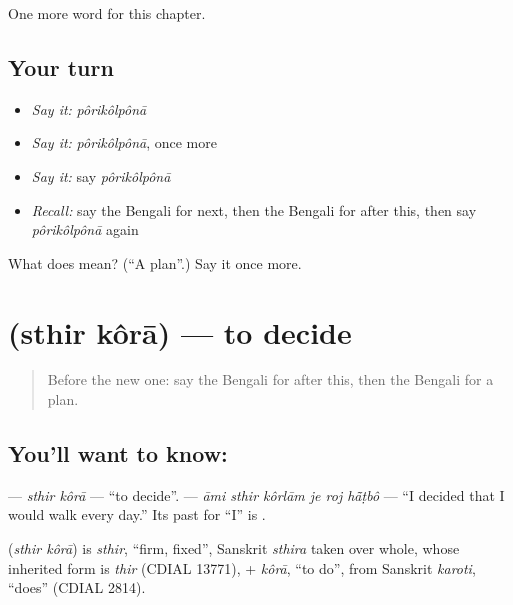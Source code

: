\begin{grammarlens}[title={What you've built}]
One more word for this chapter.
\end{grammarlens}

\subsection*{Your turn}
\begin{itemize}
\raggedright
  \item \emph{Say it:} \emph{pôrikôlpônā}
  \item \emph{Say it:} \emph{pôrikôlpônā}, once more
  \item \emph{Say it:} say \emph{pôrikôlpônā}
  \item \emph{Recall:} say the Bengali for next, then the Bengali for after this, then say \emph{pôrikôlpônā} again
\end{itemize}

\begin{tcolorbox}[breakable,colback=teal!4,colframe=teal!35!black,title={Before you move on}]
What does  mean? (\textquotedblleft{}A plan\textquotedblright{}.) Say it once more.
\end{tcolorbox}
\section[\texorpdfstring{\bn{স্থির} \bn{করা} (sthir kôrā)}{স্থির করা (sthir kôrā)}]{  (sthir kôrā) — to decide}

\label{lesson:BN-C146-sthir-kora}



\begin{quote}
Before the new one: say the Bengali for after this, then the Bengali for a plan.
\end{quote}

\subsection*{You'll want to know:  }
\textbf{ } — \emph{sthir kôrā} — \textquotedblleft{}to decide\textquotedblright{}. \textbf{     } — \emph{āmi sthir kôrlām je roj hā̃ṭbô} — \textquotedblleft{}I decided that I would walk every day.\textquotedblright{} Its past for \textquotedblleft{}I\textquotedblright{} is \textbf{}.

\begin{cousinweb}
\textbf{ } (\emph{sthir kôrā}) is \emph{sthir}, \textquotedblleft{}firm, fixed\textquotedblright{}, Sanskrit \emph{sthira} taken over whole, whose inherited form is \emph{thir} (CDIAL 13771), + \emph{kôrā}, \textquotedblleft{}to do\textquotedblright{}, from Sanskrit \emph{karoti}, \textquotedblleft{}does\textquotedblright{} (CDIAL 2814).
\end{cousinweb}

